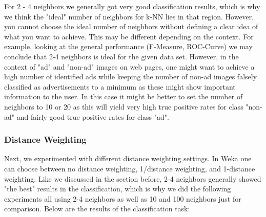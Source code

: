 \documentclass{article}
\begin{document}
For 2 - 4 neighbors we generally got very good classification results, which is why we think the "ideal" number of neighbors for k-NN lies in that region. However, you cannot choose the ideal number of neighbors without defining a clear idea of what you want to achieve. This may be different depending on the context. For example, looking at the general performance (F-Measure, ROC-Curve) we may conclude that 2-4 neighbors is ideal for the given data set. However, in the context of "ad" and "non-ad" images on web pages, one might want to achieve a high number of identified ads while keeping the number of non-ad images falsely classified  as advertisements to a minimum as these might show important information to the user. In this case it might be better to set the number of neighbors to 10 or 20 as this will yield very high true positive rates for class "non-ad" and fairly good true positive rates for class "ad". 

\subsubsection{Distance Weighting}
Next, we experimented with different distance weighting settings. In Weka one can choose between no distance weighting, 1/distance weighting, and 1-distance weighting. Like we discussed in the section before, 2-4 neighbors generally showed "the best" results in the classification, which is why we did the following experiments all using 2-4 neighbors as well as 10 and 100 neighbors just for comparison. Below are the results of the classification task:
\end{document}
